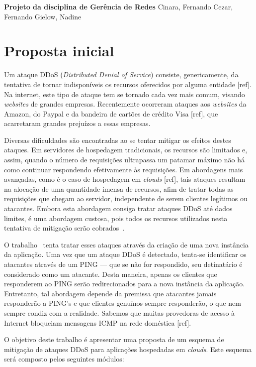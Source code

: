 \documentclass[a4paper, 11pt]{article}
\begin{document}
{
\begin{center}
{\LARGE \textbf{Projeto da disciplina de Gerência de Redes}}
\vskip 0.5cm
{\Large Cinara, Fernando Cezar, Fernando Gielow, Nadine}
\end{center}
}

\section{Proposta inicial}

Um ataque DDoS (\textit{Distributed Denial of Service}) consiste, genericamente, da tentativa de tornar indisponíveis os recursos oferecidos por alguma entidade [ref]. Na internet, este tipo de ataque tem se tornado cada vez mais comum, visando \emph{websites} de grandes empresas. Recentemente ocorreram ataques aos \emph{websites} da Amazon, do Paypal e da bandeira de cartões de crédito Visa [ref], que acarretaram grandes prejuízos a essas empresas.

Diversas dificuldades são encontradas ao se tentar mitigar os efeitos destes ataques. Em servidores de hospedagem tradicionais, os recursos são limitados e, assim, quando o número de requisições ultrapassa um patamar máximo não há como continuar respondendo efetivamente às requisições. Em abordagens mais avançadas, como é o caso de hospedagem em \emph{clouds} [ref], tais ataques resultam na alocação de uma quantidade imensa de recursos, afim de tratar todas as requisições que chegam ao servidor, independente de serem clientes legítimos ou atacantes. Embora esta abordagem consiga tratar ataques DDoS até dados limites, é uma abordagem custosa, pois todos os recursos utilizados nesta tentativa de mitigação serão cobrados~\cite{Khor:2009p24701}.

O trabalho~\cite{Bakshi:2010p24702} tenta tratar esses ataques através da criação de uma nova instância da aplicação. Uma vez que um ataque DDoS é detectado, tenta-se identificar os atacantes através de um PING --- que se não for respondido, seu detinatário é considerado como um atacante. Desta maneira, apenas os clientes que responderem ao PING serão redirecionados para a nova instância da aplicação. Entretanto, tal abordagem depende da premissa que atacantes jamais responderão a PING's e que clientes genuínos sempre responderão, o que nem sempre condiz com a realidade. Sabemos que muitas provedoras de acesso à Internet bloqueiam mensagens ICMP na rede doméstica [ref].

O objetivo deste trabalho é apresentar uma proposta de um esquema de mitigação de ataques DDoS para aplicações hospedadas em \emph{clouds}. Este esquema será composto pelos seguintes módulos:
\end{document}
